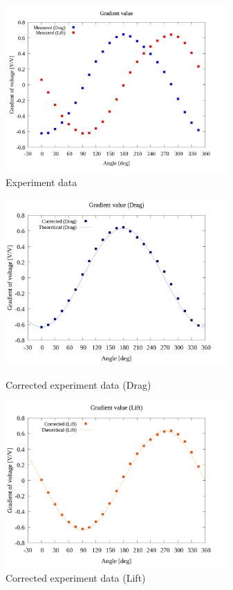 \documentclass[twocolumn,a4j]{jsarticle}
\begin{document}
\begin{figure}[htbp]
    \footnotesize
    \begin{center}
        \includegraphics[width=85mm]{../../../02_workspace/result/2-ex/plot/05/05_summary-wave.png}
        \caption{Experiment data}
    \end{center}
\end{figure}

\begin{figure}[htbp]
    \footnotesize
    \begin{center}
        \includegraphics[width=85mm]{../../../02_workspace/result/2-ex/plot/21/21-4_corrected_angle_drag.png}
        \caption{Corrected experiment data (Drag) }
        \includegraphics[width=85mm]{../../../02_workspace/result/2-ex/plot/21/21-4_corrected_angle_lift.png}
        \caption{Corrected experiment data (Lift) }
    \end{center}
\end{figure}
\end{document}
